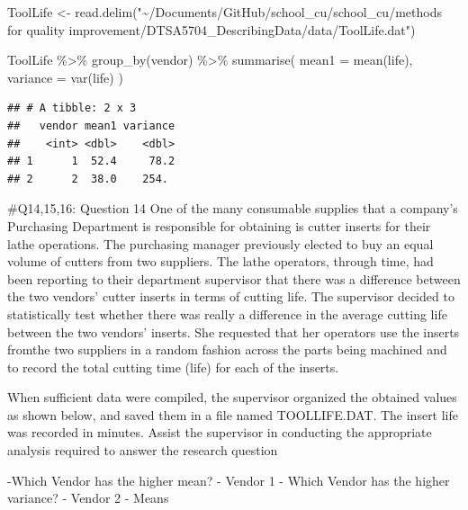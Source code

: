\documentclass[
]{article}
\newenvironment{Shaded}{\begin{snugshade}}{\end{snugshade}}
\newcommand{\AttributeTok}[1]{\textcolor[rgb]{0.77,0.63,0.00}{#1}}
\newcommand{\FunctionTok}[1]{\textcolor[rgb]{0.00,0.00,0.00}{#1}}
\newcommand{\NormalTok}[1]{#1}
\newcommand{\OtherTok}[1]{\textcolor[rgb]{0.56,0.35,0.01}{#1}}
\newcommand{\SpecialCharTok}[1]{\textcolor[rgb]{0.00,0.00,0.00}{#1}}
\newcommand{\StringTok}[1]{\textcolor[rgb]{0.31,0.60,0.02}{#1}}
\begin{document}
\begin{Shaded}
\begin{Highlighting}[]
\NormalTok{ToolLife }\OtherTok{\textless{}{-}} \FunctionTok{read.delim}\NormalTok{(}\StringTok{"\textasciitilde{}/Documents/GitHub/school\_cu/school\_cu/methods for quality improvement/DTSA5704\_DescribingData/data/ToolLife.dat"}\NormalTok{)}
\end{Highlighting}
\end{Shaded}

\begin{Shaded}
\begin{Highlighting}[]
\NormalTok{ToolLife }\SpecialCharTok{\%\textgreater{}\%} \FunctionTok{group\_by}\NormalTok{(vendor) }\SpecialCharTok{\%\textgreater{}\%} \FunctionTok{summarise}\NormalTok{(}
  \AttributeTok{mean1 =} \FunctionTok{mean}\NormalTok{(life),}
  \AttributeTok{variance =} \FunctionTok{var}\NormalTok{(life)}
\NormalTok{)}
\end{Highlighting}
\end{Shaded}

\begin{verbatim}
## # A tibble: 2 x 3
##   vendor mean1 variance
##    <int> <dbl>    <dbl>
## 1      1  52.4     78.2
## 2      2  38.0    254.
\end{verbatim}

\#Q14,15,16: Question 14 One of the many consumable supplies that a
company's Purchasing Department is responsible for obtaining is cutter
inserts for their lathe operations. The purchasing manager previously
elected to buy an equal volume of cutters from two suppliers. The lathe
operators, through time, had been reporting to their department
supervisor that there was a difference between the two vendors' cutter
inserts in terms of cutting life. The supervisor decided to
statistically test whether there was really a difference in the average
cutting life between the two vendors' inserts. She requested that her
operators use the inserts fromthe two suppliers in a random fashion
across the parts being machined and to record the total cutting time
(life) for each of the inserts.

When sufficient data were compiled, the supervisor organized the
obtained values as shown below, and saved them in a file named
TOOLLIFE.DAT. The insert life was recorded in minutes. Assist the
supervisor in conducting the appropriate analysis required to answer the
research question

-Which Vendor has the higher mean? - Vendor 1 - Which Vendor has the
higher variance? - Vendor 2 - Means
\end{document}
